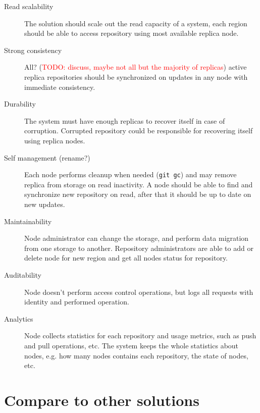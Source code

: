 \documentclass[12pt,oneside]{article}
\newcommand{\code}[1]{\texttt{#1}}
\newcommand{\todo}[1]{\textcolor{red}{TODO: #1}}
\begin{document}
\begin{description}
  \item[Read scalability]
    The solution should scale out the read capacity of a system, each region should be able
    to access repository using most available replica node.
  \item[Strong consistency]
    All? (\todo{discuss, maybe not all but the majority of replicas})
    active replica repositories should be synchronized on updates in any node
    with immediate consistency.
  \item[Durability]
    The system must have enough replicas to recover itself in case of corruption.
    Corrupted repository could be responsible for recovering itself using replica nodes.
  \item[Self management (rename?)]
    Each node performs cleanup when needed (\code{git gc}) and may remove replica
    from storage on read inactivity.
    A node should be able to find and synchronize new repository on read,
    after that it should be up to date on new updates.
  \item[Maintainability]
    Node administrator can change the storage, and perform data migration from one storage
    to another.
    Repository administrators are able to add or delete node for new region and
    get all nodes status for repository.
  \item[Auditability]
    Node doesn't perform access control operations, but logs all
    requests with identity and performed operation.
  \item[Analytics]
    Node collects statistics for each repository and usage metrics, such as
    push and pull operations, etc. The system keeps the whole statistics about
    nodes, e.g. how many nodes contains each repository, the state of nodes, etc.
\end{description}


\section{Compare to other solutions}
\end{document}
